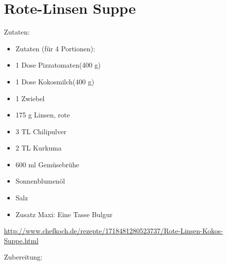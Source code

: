 \section{Rote-Linsen Suppe}
Zutaten:
\begin{itemize}
	\item Zutaten (für 4 Portionen):
	\item 1 Dose	Pizzatomaten(400 g)
	\item 1 Dose	Kokosmilch(400 g)
	\item 1 	Zwiebel
	\item 175 g	Linsen, rote
	\item 3 TL	Chilipulver
	\item 2 TL	Kurkuma
	\item 600 ml	Gemüsebrühe
	\item Sonnenblumenöl
	\item Salz
	\item Zusatz Maxi: Eine Tasse Bulgur
\end{itemize}

\url{http://www.chefkoch.de/rezepte/1718481280523737/Rote-Linsen-Kokos-Suppe.html}

\noindent Zubereitung:

\noindent
\mbox{}
\vfill
\begin{center}
\end{center}
\vfill
\mbox{ }
\newpage
